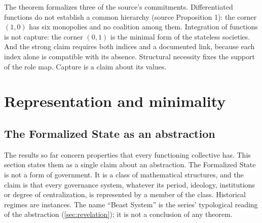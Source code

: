 \documentclass[11pt,letterpaper]{article}
\theoremstyle{definition}
\theoremstyle{remark}
\begin{document}
The theorem formalizes three of the source's commitments. Differentiated functions do not establish a common hierarchy (source Proposition 1): the corner $(1,0)$ has six monopolies and no coalition among them. Integration of functions is not capture: the corner $(0,1)$ is the minimal form of the stateless societies. And the strong claim requires both indices and a documented link, because each index alone is compatible with its absence. Structural necessity fixes the support of the role map. Capture is a claim about its values.

\section{Representation and minimality}
\label{sec:representation}

\subsection{The Formalized State as an abstraction}

The results so far concern properties that every functioning collective has. This section states them as a single claim about an abstraction. The Formalized State is not a form of government. It is a class of mathematical structures, and the claim is that every governance system, whatever its period, ideology, institutions or degree of centralization, is represented by a member of the class. Historical regimes are instances. The name ``Beast System'' is the series' typological reading of the abstraction (\cref{sec:revelation}); it is not a conclusion of any theorem.
\end{document}
